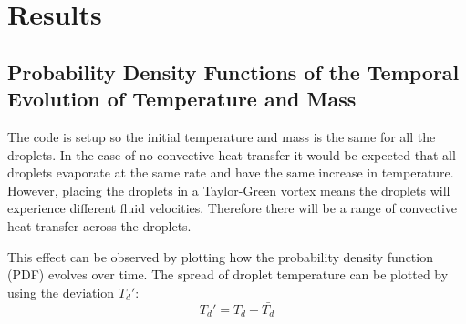 \documentclass[../Interim_Report_Master]{subfiles}
\begin{document}
\hypertarget{res}{\section{Results}\label{res}}
\subsection{Probability Density Functions of the Temporal Evolution of Temperature and Mass }
The code is setup so the initial temperature and mass is the same for all the droplets. In the case of no convective heat transfer it would be expected that all droplets evaporate at the same rate and have the same increase in temperature. However, placing the droplets in a Taylor-Green vortex means the droplets will experience different fluid velocities. Therefore there will be a range of convective heat transfer across the droplets.

This effect can be observed by plotting how the probability density function (PDF) evolves over time. The spread of droplet temperature can be plotted by using the deviation ${T_d}'$:
\begin{equation}
{T_d}' = T_d - \bar{T_d}
\end{equation}
\end{document}
